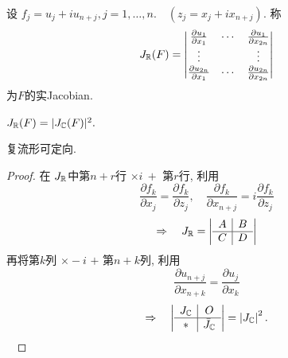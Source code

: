 设 $ f_j=u_j+iu_{n+j}, j=1,\dots,n. \quad (z_j=x_j+ix_{n+j})$. 称 
$$ J_{{\mathbb R}}(F)=
\begin{vmatrix}
\frac{\partial u_1}{\partial x_1} & \cdots& \frac{\partial u_1}{\partial x_{2n}}\\
\vdots & &  \vdots \\
\frac{\partial u_{2n}}{\partial x_1} & \cdots& \frac{\partial u_{2n}}{\partial x_{2n}}\\
\end{vmatrix} $$
为$F$的实Jacobian. 

\begin{proposition}\label{pro1}
$ J_{{\mathbb R}} (F)=|J_{{\mathbb C}}(F)|^2.$ 
\end{proposition}
\begin{corollary}
复流形可定向. 
\end{corollary}
\begin{proof}
  在 $ J_{{\mathbb R}} $中第$n+r$行 $ \times i ~+$ 第$r$行, 利用 
  $$ \frac{\partial f_k}{\partial x_j} = \frac{\partial f_k}{\partial z_j} ,\quad \frac{\partial f_k}{\partial x_{n+j}}=i \frac{\partial f_k}{\partial z_j}   $$
  $$ \Rightarrow \quad  J_{{\mathbb R}}=
  \left|
\begin{array}{c|c}
A & B \\
\hline
C & D
\end{array}
\right| $$
再将第$k$列 $ \times  -i$ $ + $ 第$n+k$列, 利用 
$$ \frac{\partial u_{n+j}}{\partial x_{n+k}} = \frac{\partial u_{j}}{\partial x_{k}}$$
$$ \Rightarrow \quad \left|
  \begin{array}{c|c}
  J_{{\mathbb C}} & O \\
  \hline
  * & \bar{J}_{{\mathbb C}}
  \end{array}
  \right| = \left| J_{{\mathbb C}} \right|^2. $$ ~
\end{proof}

